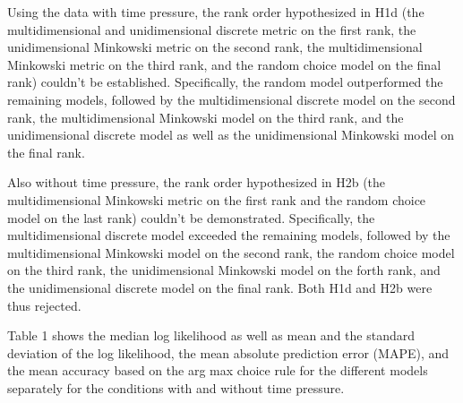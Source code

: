 \documentclass[a4paper,man,natbib]{apa6}
\begin{document}
Using the data with time pressure, the rank order hypothesized in H1d (the multidimensional and unidimensional discrete metric on the first rank, the unidimensional Minkowski metric on the second rank, the multidimensional Minkowski metric on the third rank, and the random choice model on the final rank) couldn't be established. Specifically, the random model outperformed the remaining models, followed by the multidimensional discrete model on the second rank, the multidimensional Minkowski model on the third rank, and the unidimensional discrete model as well as the unidimensional Minkowski model on the final rank. 

Also without time pressure, the rank order hypothesized in H2b (the multidimensional Minkowski metric on the first rank and the random choice model on the last rank) couldn't be demonstrated. Specifically, the multidimensional discrete model exceeded the remaining models, followed by the multidimensional Minkowski model on the second rank, the random choice model on the third rank, the unidimensional Minkowski model on the forth rank, and the unidimensional discrete model on the final rank. Both H1d and H2b were thus rejected.

Table 1 shows the median log likelihood as well as mean and the standard deviation of the log likelihood, the mean absolute prediction error (MAPE), and the mean accuracy based on the arg max choice rule for the different models separately for the conditions with and without time pressure.
\end{document}
